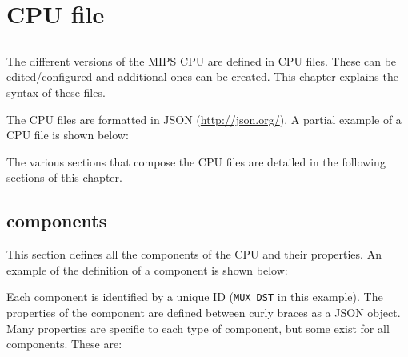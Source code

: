 \documentclass[11pt,a4paper,twoside,titlepage]{report}
\author{Bruno Nova}
\title{\Title}
\begin{document}
\maketitle
\tableofcontents

\chapter{CPU file}

\section*{}

The different versions of the MIPS CPU are defined in CPU files.
These can be edited/configured and additional ones can be created.
This chapter explains the syntax of these files.

The CPU files are formatted in JSON (\url{http://json.org/}).
A partial example of a CPU file is shown below:



The various sections that compose the CPU files are detailed in the
following sections of this chapter.


\section{components}

This section defines all the components of the CPU and their properties.
An example of the definition of a component is shown below:



Each component is identified by a unique ID (\verb+MUX_DST+ in this example).
The properties of the component are defined between curly braces as a JSON
object. Many properties are specific to each type of component, but some exist
for all components. These are:
\end{document}
